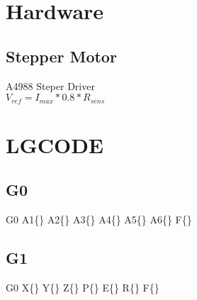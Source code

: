 \documentclass{article}
\begin{document}
\section{Hardware}
\subsection{Stepper Motor}
\par
A4988 Steper Driver \\
$V_{ref} = I_{max} * 0.8 * R_{sens}$


\section{LGCODE}
\subsection{G0}
G0 A1\{\} A2\{\} A3\{\} A4\{\} A5\{\} A6\{\} F\{\}

\subsection{G1}
G0 X\{\} Y\{\} Z\{\} P\{\} E\{\} R\{\} F\{\}
\end{document}
